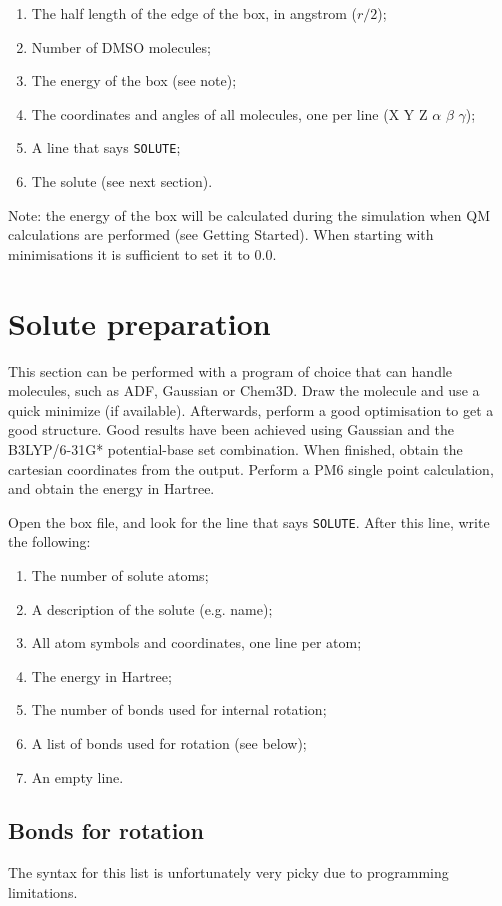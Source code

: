 \begin{enumerate}
	\item The half length of the edge of the box, in angstrom ($r/2$);
	\item Number of DMSO molecules;
	\item The energy of the box (see note);
	\item The coordinates and angles of all molecules, one per line (X Y Z 
	$\alpha$ $\beta$ $\gamma$);
	\item A line that says \verb|SOLUTE|;
	\item The solute (see next section).
\end{enumerate}

Note: the energy of the box will be calculated during the simulation when QM 
calculations are performed (see Getting Started). When starting with 
minimisations it is sufficient to set it to $0.0$.

\section{Solute preparation}
This section can be performed with a program of choice that can handle 
molecules, such as ADF, Gaussian or Chem3D. Draw the molecule and use a quick 
minimize (if available). Afterwards, perform a good optimisation to get a good 
structure. Good results have been achieved using Gaussian and the B3LYP/6-31G* 
potential-base set combination.
When finished, obtain the cartesian coordinates from the output. Perform a PM6 
single point calculation, and obtain the energy in Hartree.

 Open the box file, and look for the line that says \verb|SOLUTE|. After this 
 line, write the following:

\begin{enumerate}
	\item The number of solute atoms;
	\item A description of the solute (e.g. name);
	\item All atom symbols and coordinates, one line per atom;
	\item The energy in Hartree;
	\item The number of bonds used for internal rotation;
	\item A list of bonds used for rotation (see below);
	\item An empty line.
\end{enumerate}

\subsection{Bonds for rotation}
The syntax for this list is unfortunately very picky due to programming 
limitations. 

